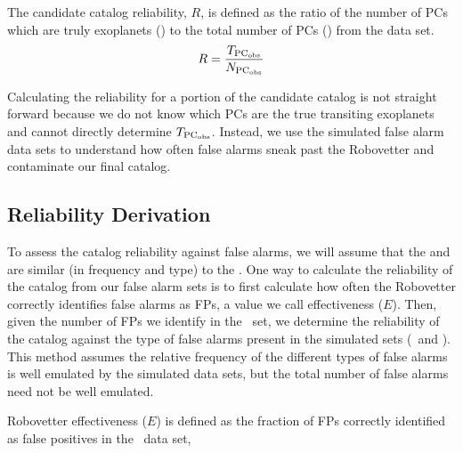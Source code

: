 

The candidate catalog reliability, $R$, is defined as the ratio of the number of PCs which are truly exoplanets (\trueopspc) to the total number of PCs (\opspc) from the \opstce{} data set. 
\begin{equation}
\label{eq:rel}
R = \frac{T_{\rm PC_{\rm obs}}}{N_{\rm PC_{\rm obs}}}
\end{equation}

Calculating the reliability for a portion of the candidate catalog is not straight forward because we do not know which PCs are the true transiting exoplanets and cannot directly determine $T_{\rm PC_{\rm obs}}$. Instead, we use the simulated false alarm data sets to understand how often false alarms sneak past the Robovetter and contaminate our final catalog.


\subsection{Reliability Derivation}
\label{s:relcalc}
To assess the catalog reliability against false alarms, we will assume that the  and  are similar (in frequency and type) to the \opstces.  One way to calculate the reliability of the catalog from our false alarm sets is to first calculate how often the Robovetter correctly identifies false alarms as FPs, a value we call effectiveness ($E$).  Then, given the number of FPs we identify in the \opstce\ set, we determine the reliability of the catalog against the type of false alarms present in the simulated sets (\invtces\ and \scrtces). This method assumes the relative frequency of the different types of false alarms is well emulated by the simulated data sets, but the total number of false alarms need not be well emulated.


Robovetter effectiveness ($E$) is defined as the fraction of FPs correctly identified as false positives in the \opstce\ data set,

